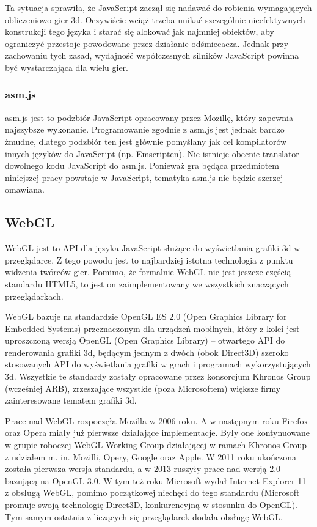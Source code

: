 Ta sytuacja sprawiła, że JavaScript zaczął się nadawać do robienia wymagających obliczeniowo
gier 3d. Oczywiście wciąż trzeba unikać szczególnie nieefektywnych konstrukcji tego języka
i starać się alokować jak najmniej obiektów, aby ograniczyć przestoje powodowane przez działanie
odśmiecacza. Jednak przy zachowaniu tych zasad, wydajność współczesnych silników JavaScript
powinna być wystarczająca dla wielu gier.


\subsubsection{asm.js}
\label{sec:asmjs}

asm.js jest to podzbiór JavaScript opracowany przez Mozillę, który zapewnia najszybsze wykonanie.
Programowanie zgodnie z asm.js jest jednak bardzo żmudne, dlatego podzbiór ten jest głównie
pomyślany jak cel kompilatorów innych języków do JavaScript (np. Emscripten). Nie istnieje
obecnie translator dowolnego kodu JavaScript do asm.js. Ponieważ gra będąca przedmiotem niniejszej
pracy powstaje w JavaScript, tematyka asm.js nie będzie szerzej omawiana.

\subsection{WebGL}
\label{ssec:webgl}

WebGL jest to API dla języka JavaScript służące do wyświetlania grafiki 3d w przeglądarce.
Z tego powodu jest to najbardziej istotna technologia z punktu widzenia
twórców gier. Pomimo, że formalnie WebGL nie jest jeszcze
częścią standardu HTML5, to jest on zaimplementowany we wszystkich znaczących
przeglądarkach.

WebGL bazuje na standardzie OpenGL ES 2.0 (Open Graphics Library for
Embedded Systems) przeznaczonym dla urządzeń mobilnych, który z kolei
jest uproszczoną wersją OpenGL (Open Graphics Library) -- otwartego API do
renderowania grafiki 3d, będącym jednym z dwóch (obok Direct3D) szeroko
stosowanych API do wyświetlania grafiki w grach i programach wykorzystujących 3d.
Wszystkie te standardy zostały opracowane przez konsorcjum Khronos Group (wcześniej ARB),
zrzeszające wszystkie (poza Microsoftem) większe firmy zainteresowane tematem grafiki 3d.

Prace nad WebGL rozpoczęła Mozilla w 2006 roku. A w następnym roku Firefox oraz Opera
miały już pierwsze działające implementacje. Były one kontynuowane w grupie roboczej
WebGL Working Group działającej w ramach Khronos Group z udziałem m. in. Mozilli,
Opery, Google oraz Apple. W 2011 roku ukończona została pierwsza wersja standardu, a w 2013
ruszyły prace nad wersją 2.0 bazującą na OpenGL 3.0. W tym też roku Microsoft wydał
Internet Explorer 11 z obsługą WebGL, pomimo początkowej niechęci do tego standardu
(Microsoft promuje swoją technologię Direct3D, konkurencyjną w stosunku do OpenGL).
Tym samym ostatnia z liczących się przeglądarek dodała obsługę WebGL.

